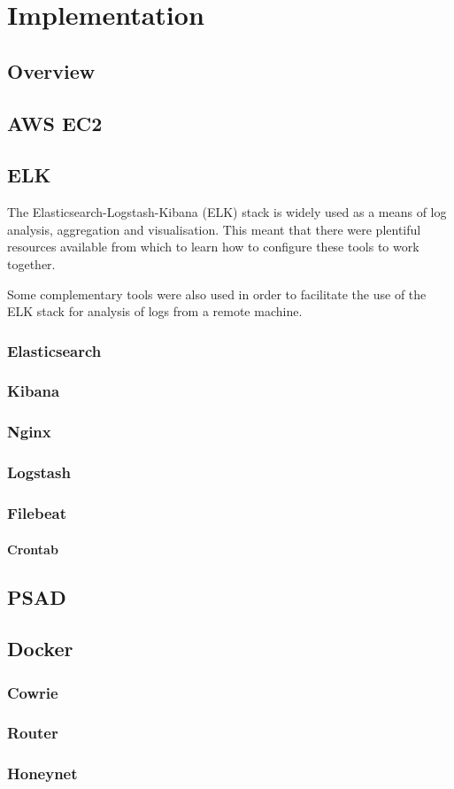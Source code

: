 \chapter{Implementation}



\section{Overview}



\section{AWS EC2}


\section{ELK}

The Elasticsearch-Logstash-Kibana (ELK) stack is widely used as a means of log analysis, aggregation and visualisation. This meant that there were plentiful resources available from which to learn how to configure these tools to work together.

Some complementary tools were also used in order to facilitate the use of the ELK stack for analysis of logs from a remote machine.

	\subsection{Elasticsearch}
	\subsection{Kibana}
	\subsection{Nginx}
	\subsection{Logstash}
	\subsection{Filebeat}
		\subsubsection{Crontab}

\section{PSAD}

\section{Docker}
	\subsection{Cowrie}
	\subsection{Router}
	\subsection{Honeynet}
